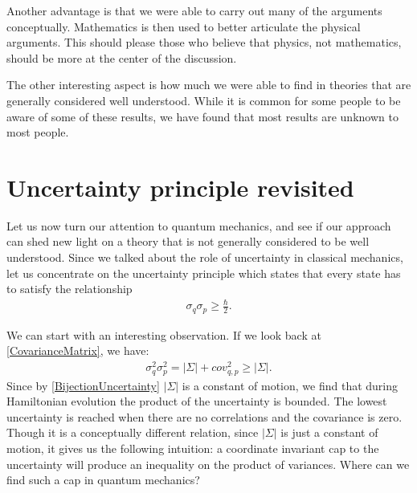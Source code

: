 \documentclass[10pt,twocolumn, nofootinbib]{revtex4-2}
\begin{document}
Another advantage is that we were able to carry out many of the arguments conceptually. Mathematics is then used to better articulate the physical arguments. This should please those who believe that physics, not mathematics, should be more at the center of the discussion. 

The other interesting aspect is how much we were able to find in theories that are generally considered well understood. While it is common for some people to be aware of some of these results, we have found that most results are unknown to most people.

\section{Uncertainty principle revisited}


Let us now turn our attention to quantum mechanics, and see if our approach can shed new light on a theory that is not generally considered to be well understood. Since we talked about the role of uncertainty in classical mechanics, let us concentrate on the uncertainty principle which states that every state has to satisfy the relationship
\begin{align}\label{UncertaintyPrinciple}
	\sigma_q \sigma_p \geq \frac{\hbar}{2}.
\end{align}

We can start with an interesting observation. If we look back at \eqref{CovarianceMatrix}, we have:
\begin{align}
	\sigma_q^2 \sigma_p^2 = |\Sigma| + cov_{q,p}^2 \geq |\Sigma|.
\end{align}
Since by \eqref{BijectionUncertainty} $|\Sigma|$ is a constant of motion, we find that during Hamiltonian evolution the product of the uncertainty is bounded. The lowest uncertainty is reached when there are no correlations and the covariance is zero. Though it is a conceptually different relation, since $|\Sigma|$ is just a constant of motion, it gives us the following intuition: a coordinate invariant cap to the uncertainty will produce an inequality on the product of variances. Where can we find such a cap in quantum mechanics?
\end{document}
